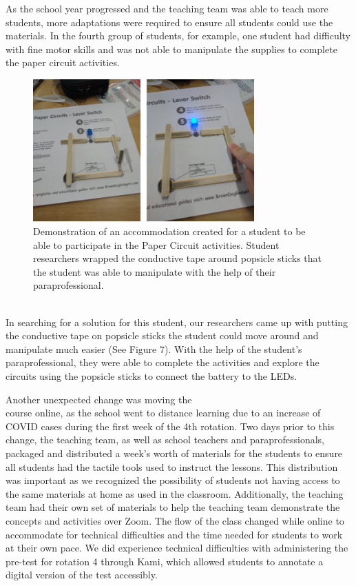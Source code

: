 \documentclass[11.5pt]{sig-alternate}
\begin{document}
\begin{large}
As the school year progressed and the teaching team was able to teach more students, more adaptations were required to ensure all students could use the materials. In the fourth group of students, for example, one student had difficulty with fine motor skills and was not able to manipulate the supplies to complete the paper circuit activities. 
\renewcommand{\thefigure}{7}
\begin{figure}[h!]
\centering
\includegraphics[width=8.5cm]{figure 7.png}
\caption{ Demonstration of an accommodation created for a student to be able to participate in the Paper Circuit activities. Student researchers wrapped the conductive tape around popsicle sticks that the student was able to manipulate with the help of their paraprofessional.}
\end{figure}
\\ In searching for a solution for this student, our researchers came up with putting the conductive tape on popsicle sticks the student could move around and manipulate much easier (See Figure 7). With the help of the student’s paraprofessional, they were able to complete the activities and explore the circuits using the popsicle sticks to connect the battery to the LEDs.

Another unexpected change was moving the \\course online, as the school went to distance learning due to an increase of COVID cases during the first week of the 4th rotation. Two days prior to this change, the teaching team, as well as school teachers and paraprofessionals, packaged and distributed a week’s worth of materials for the students to ensure all students had the tactile tools used to instruct the lessons. This distribution was important as we recognized the possibility of students not having access to the same materials at home as used in the classroom. Additionally, the teaching team had their own set of materials to help the teaching team demonstrate the concepts and activities over Zoom. The flow of the class changed while online to accommodate for technical difficulties and the time needed for students to work at their own pace. We did experience technical difficulties with administering the pre-test for rotation 4 through Kami, which allowed students to annotate a digital version of the test accessibly.


\end{large}
\end{document}
